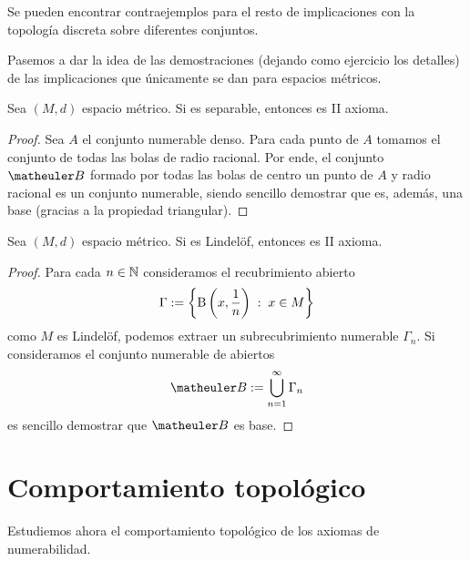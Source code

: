 Se pueden encontrar contraejemplos para el resto de implicaciones con la topología discreta sobre diferentes conjuntos.

Pasemos a dar la idea de las demostraciones (dejando como ejercicio los detalles) de las implicaciones que únicamente se dan para espacios métricos.
\begin{lem}[Separabilidad]
	Sea $(M,d)$ espacio métrico. Si es separable, entonces es II axioma.
\end{lem}
\begin{proof}
	Sea $A$ el conjunto numerable denso. Para cada punto de $A$ tomamos el conjunto de todas las bolas de radio racional. Por ende, el conjunto $\B$ formado por todas las bolas de centro un punto de $A$ y radio racional es un conjunto numerable, siendo sencillo demostrar que es, además, una base (gracias a la propiedad triangular).
\end{proof}
\begin{lem}[Lindelöf]
	Sea $(M,d)$ espacio métrico. Si es Lindelöf, entonces es II axioma.
\end{lem}
\begin{proof}
	Para cada $n\in\mathbb{N}$ consideramos el recubrimiento abierto
	\begin{equation*}
		\Gamma:=\left\{\operatorname{B}\left(x,\frac{1}{n}\right)\;:\; x\in M\right\}
	\end{equation*}
	como $M$ es Lindelöf, podemos extraer un subrecubrimiento numerable $\Gamma_n$. Si consideramos el conjunto numerable de abiertos
	\begin{equation*}
		\B:=\bigcup_{n=1}^{\infty}\Gamma_n
	\end{equation*}
	es sencillo demostrar que $\B$ es base. 
	\end{proof}
\section{Comportamiento topológico}
\label{num_comportamiento}
Estudiemos ahora el comportamiento topológico de los axiomas de numerabilidad.
